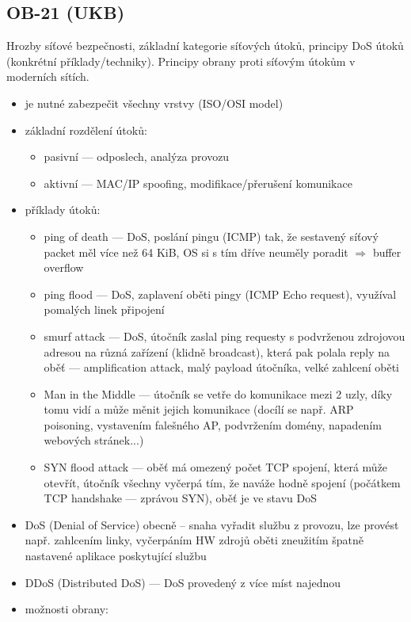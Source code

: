 \subsection{OB-21 (UKB)}
Hrozby síťové bezpečnosti, základní kategorie síťových útoků, principy DoS útoků (konkrétní příklady/techniky). Principy obrany proti síťovým útokům v moderních sítích.

\begin{itemize}
	\item je nutné zabezpečit všechny vrstvy (ISO/OSI model)
	\item základní rozdělení útoků:
	\begin{itemize}
		\item pasivní --- odposlech, analýza provozu
		\item aktivní --- MAC/IP spoofing, modifikace/přerušení komunikace
	\end{itemize}
	\item příklady útoků:
	\begin{itemize}
		\item ping of death --- DoS, poslání pingu (ICMP) tak, že sestavený síťový packet měl více než 64 KiB, OS si s tím dříve neuměly poradit $\Rightarrow$ buffer overflow
		\item ping flood --- DoS, zaplavení oběti pingy (ICMP Echo request), využíval pomalých linek připojení
		\item smurf attack --- DoS, útočník zaslal ping requesty s podvrženou zdrojovou adresou na různá zařízení (klidně broadcast), která pak polala reply na oběť --- amplification attack, malý payload útočníka, velké zahlcení oběti
		\item Man in the Middle --- útočník se vetře do komunikace mezi 2 uzly, díky tomu vidí a může měnit jejich komunikace (docílí se např. ARP poisoning, vystavením falešného AP, podvržením domény, napadením webových stránek...)
		\item SYN flood attack --- oběť má omezený počet TCP spojení, která může otevřít, útočník všechny vyčerpá tím, že naváže hodně spojení (počátkem TCP handshake --- zprávou SYN), oběť je ve stavu DoS
	\end{itemize}
	\item DoS (Denial of Service) obecně -- snaha vyřadit službu z provozu, lze provést např. zahlcením linky, vyčerpáním HW zdrojů oběti zneužitím špatně nastavené aplikace poskytující službu
	\item DDoS (Distributed DoS) --- DoS provedený z více míst najednou
	\item možnosti obrany:

\end{itemize}
